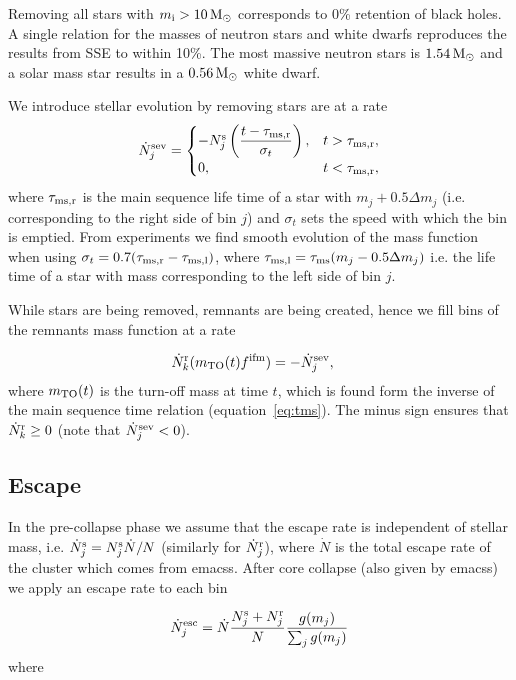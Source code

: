 \documentclass[useAMS,usenatbib,fleqn]{mnras}
\newcommand{\msun}{{\rm M}_\odot}
\newcommand{\comm}[1]{#1}
\def\fifm{f^{\rm ifm}}
\def\sigmat{\sigma_t}
\def\tmsright{\tau_{\rm ms,r}}
\def\tmsleft{\tau_{\rm ms,l}}
\newcommand{\mi}{m_{\rm i}}
\newcommand{\njs}{N_j^{\rm s}}
\newcommand{\njr}{N_j^{\rm r}}
\newcommand{\njrdot}{\dot{N}_j^{\rm r}}
\newcommand{\njsdot}{\dot{N}_j^{\rm s}}
\newcommand{\njescdot}{\dot{N}_j^{\rm  esc}}
\newcommand{\njssevdot}{\dot{N}_j^{\rm sev}}
\newcommand{\nkrdot}{\dot{N}_k^{\rm r}}
\newcommand{\tms}{\tau_{\rm ms}}
\newcommand{\mto}{m_{\rm TO}}
\begin{document}
Removing all stars with $\mi>10\,\msun$ corresponds to 0\% retention of black
holes. A single relation for the masses of neutron stars and white dwarfs
reproduces the results from SSE to within 10\%. The most massive neutron stars
is $1.54\,\msun$ and a solar mass star results in a $0.56\,\msun$ white dwarf.

\comm{We introduce stellar evolution by removing stars are at a rate}
\begin{align}
\njssevdot  = 
\begin{cases}
    -\njs\left(\dfrac{t-\tmsright}{\sigmat}\right), &t>\tmsright,\\
0,& t<\tmsright,
\end{cases}
\end{align}
where $\tmsright$ is the main sequence life time of a star with $m_j + 0.5\Delta
m_j$ (i.e. corresponding to the right side of  bin $j$) and $\sigmat$ sets the
speed with which the bin is emptied. From experiments we find smooth evolution
of the mass function when using $\sigmat = 0.7(\tmsright-\tmsleft)$, where
$\tmsleft = \tms(m_j-0.5\Delta m_j)$ i.e. the life time of a star with mass
corresponding to the left side of bin  $j$.

While stars are being removed, remnants are being created, hence we fill bins of
the remnants mass function at a rate

\begin{align}
\nkrdot(\mto(t)\fifm)&=- \njssevdot,
\end{align}
where $\mto(t)$ is the turn-off mass at time $t$, which is found form the
inverse of the main sequence time relation (equation~\ref{eq:tms}). The minus
sign ensures that $\nkrdot\ge0$ (note that $\njssevdot<0$). 

\subsection{Escape}
\label{ssec:escape}
In the pre-collapse phase we assume that the escape rate is independent of
stellar mass, i.e. $\njsdot = \njs \dot{N}/N$ (similarly for $\njrdot$), where
$\dot{N}$ is the total escape rate of the cluster which comes from {\sc emacss}.
After core collapse (also given by {\sc emacss}) we apply an escape rate to each
bin

\begin{align}
\njescdot  = \dot{N} \frac{\njs + \njr}{N} \frac{g(m_j)}{\sum_j g(m_j)}
\end{align}
where
\end{document}
